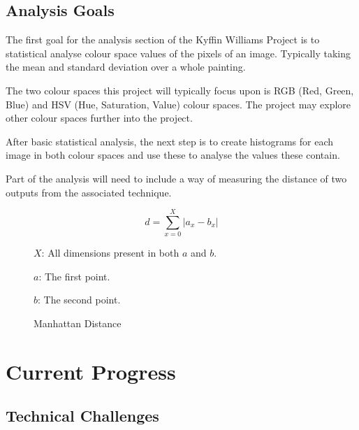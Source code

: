 \documentclass[11pt,fleqn,twoside]{article}
\begin{document}
\subsection{Analysis Goals}
The first goal for the analysis section of the Kyffin Williams Project is to statistical analyse
colour space values of the pixels of an image. Typically taking the mean and standard deviation
over a whole painting.

The two colour spaces this project will typically focus upon is RGB (Red, Green, Blue) and HSV
(Hue, Saturation, Value) colour spaces. The project may explore other colour spaces further into 
the project.

After basic statistical analysis, the next step is to create histograms for each image in both 
colour spaces and use these to analyse the values these contain.

Part of the analysis will need to include a way of measuring the distance of two outputs from the
associated technique.

\begin{figure}[p]
\label{eq:manhattan}
\[
d = \sum^X_{x=0}{|a_x - b_x|}
\]

\(X\): All dimensions present in both \(a\) and \(b\).

\(a\): The first point.

\(b\): The second point.

\caption{Manhattan Distance}
\end{figure}


\section{Current Progress}

\subsection{Technical Challenges}
\end{document}
